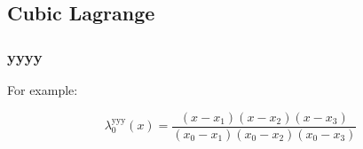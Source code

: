 \subsection{Cubic Lagrange}
 
\subsubsection{yyyy}

For example:

\begin{equation}
\lambda^{\text{yyy}}_0(x) = 
\frac {(x - x_1) (x - x_2) (x - x_3)} 
{(x_0 - x_1) (x_0 - x_2) (x_0 - x_3)}
\end{equation}

% 
% 
% 
% 
 
